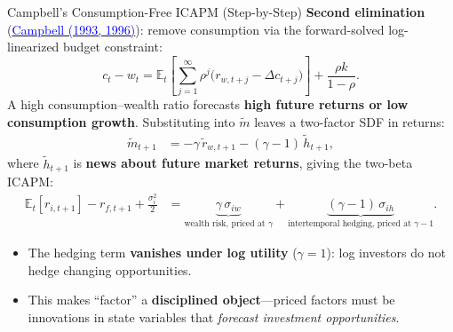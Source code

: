 \documentclass{beamer}
\newcommand{\E}{\mathbb{E}}
\newcommand{\tld}[1]{\widetilde{#1}}
\begin{document}
\begin{frame}{Campbell's Consumption-Free ICAPM (Step-by-Step)}
\small
\textbf{Second elimination} (\href{https://www.jstor.org/stable/2117530}{\textcolor{blue}{Campbell (1993, 1996)}}): remove consumption via the forward-solved log-linearized budget constraint:
\begin{equation*}
  c_t-w_t=\E_t\!\left[\sum_{j=1}^{\infty}\rho^{j}\big(r_{w,t+j}-\Delta c_{t+j}\big)\right]+\frac{\rho k}{1-\rho}.
\end{equation*}
A high consumption--wealth ratio forecasts \textbf{high future returns or low consumption growth}. Substituting into $\tld m$ leaves a two-factor SDF in returns:
\begin{align*}
  \tld{m}_{t+1}&=-\gamma\,\tld{r}_{w,t+1}-(\gamma-1)\,\tld{h}_{t+1},
\end{align*}
where $\tld h_{t+1}$ is \textbf{news about future market returns}, giving the \alert{two-beta ICAPM}:
\begin{align*}
  \E_t[r_{i,t+1}]-r_{f,t+1}+\frac{\sigma_i^2}{2}
   &=\underbrace{\gamma\,\sigma_{iw}}_{\text{wealth risk, priced at }\gamma}
    +\underbrace{(\gamma-1)\,\sigma_{ih}}_{\text{intertemporal hedging, priced at }\gamma-1}.
\end{align*}
\begin{itemize}
  \item The hedging term \textbf{vanishes under log utility} ($\gamma=1$): log investors do not hedge changing opportunities.
  \item This makes \alert{``factor''} a \textbf{disciplined object}---priced factors must be innovations in state variables that \textit{forecast investment opportunities}.
\end{itemize}
\end{frame}
\end{document}
